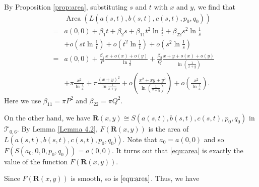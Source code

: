 \documentclass[11pt]{amsart}
\theoremstyle{plain}
\newcommand{\Tei}{\mathcal{T}}
\newcommand{\TR}{\mathbf{R}}
\begin{document}
  By Proposition \ref{prop:area}, substituting $s$ and $t$ with $x$ and $y$, we  find that  
\begin{eqnarray}\label{equ:area}
   && \operatorname{Area}(L(a(s,t),b(s,t),c(s,t),p_0,q_0)) \nonumber \\
   &= & a(0,0)+\beta_1t+\beta_2s+\beta_{11}t^2\ln \frac{1}{t}+\beta_{22}s^2\ln \frac{1}{s} \nonumber\\
    && +o(st\ln \frac{1}{t})+o(t^2\ln \frac{1}{t}) +o(s^2\ln \frac{1}{s}) \nonumber\\
    &=& a(0,0)+\frac{\beta_1}{P} \frac{x+o(x)+o(y)}{\ln \frac{1}{x}} +\frac{\beta_2 }{Q} \frac{x+y+o(x)+o(y)}{\ln \left(\frac{1}{x+y}\right)}  \\
    && + \pi \frac{x^2}{\ln \frac{1}{x}}+\pi \frac{\left(x+y \right)^2}{\ln \frac{1}{x+y}} 
    +o\left(\frac{x^2+xy+y^2}{\ln \left(\frac{1}{x+y}\right)}\right)+o\left(\frac{x^2}{\ln \frac{1}{x}}\right). \nonumber
\end{eqnarray} 
Here we use   $\beta_{11}=\pi P^2$ and $\beta_{22}=\pi Q^2$.

  
  
    
On the other hand, we have   $\TR(x,y)\cong S(a(s,t),b(s,t),c(s,t),p_0,q_0)$ in $\Tei_{0,6}$. By Lemma \ref{Lemma 4.2},  $F(\TR(x,y))$ is the area of 
    $L\left(a(s,t),b(s,t),c(s,t),p_0,q_0)\right)$.
Note that  $a_0=a(0,0)$ and so $F(S(a_0,0,0,p_0,q_0))=a(0,0)$.
It turns out that \eqref{equ:area} is exactly the value of the function $F(\TR(x,y))$.

Since $F(\TR(x,y))$ is smooth, so is $\eqref{equ:area}$. Thus, we have 
\end{document}
